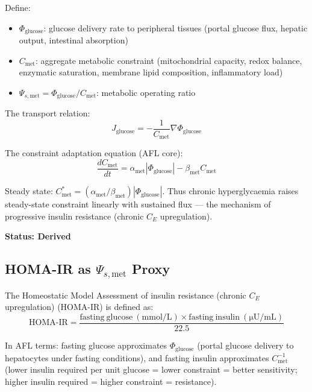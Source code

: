 \documentclass[11pt]{article}
\begin{document}
Define:
\begin{itemize}
    \item $\Phi_{\mathrm{glucose}}$: glucose delivery rate to peripheral tissues (portal glucose flux, hepatic output, intestinal absorption)
    \item $C_{\mathrm{met}}$: aggregate metabolic constraint (mitochondrial capacity, redox balance, enzymatic saturation, membrane lipid composition, inflammatory load)
    \item $\Psi_{s,\mathrm{met}} = \Phi_{\mathrm{glucose}} / C_{\mathrm{met}}$: metabolic operating ratio
\end{itemize}

The transport relation:
\begin{equation}
    J_{\mathrm{glucose}} = -\frac{1}{C_{\mathrm{met}}} \nabla \Phi_{\mathrm{glucose}}
\end{equation}

The constraint adaptation equation (AFL core):
\begin{equation}
    \frac{dC_{\mathrm{met}}}{dt} = \alpha_{\mathrm{met}} |\Phi_{\mathrm{glucose}}| - \beta_{\mathrm{met}} C_{\mathrm{met}}
    \label{eq:cmet}
\end{equation}

Steady state: $C_{\mathrm{met}}^* = (\alpha_{\mathrm{met}}/\beta_{\mathrm{met}}) |\Phi_{\mathrm{glucose}}|$. Thus chronic hyperglycaemia raises steady-state constraint linearly with sustained flux --- the mechanism of progressive insulin resistance (chronic $C_E$ upregulation).

\textbf{Status: Derived}

\subsection{HOMA-IR as $\Psi_{s,\mathrm{met}}$ Proxy}

The Homeostatic Model Assessment of insulin resistance (chronic $C_E$ upregulation) (HOMA-IR) is defined as:
\begin{equation}
    \mathrm{HOMA\text{-}IR} = \frac{\mathrm{fasting\ glucose\ (mmol/L)} \times \mathrm{fasting\ insulin\ (\mu U/mL)}}{22.5}
\end{equation}

In AFL terms: fasting glucose approximates $\Phi_{\mathrm{glucose}}$ (portal glucose delivery to hepatocytes under fasting conditions), and fasting insulin approximates $C_{\mathrm{met}}^{-1}$ (lower insulin required per unit glucose = lower constraint = better sensitivity; higher insulin required = higher constraint = resistance).
\end{document}
